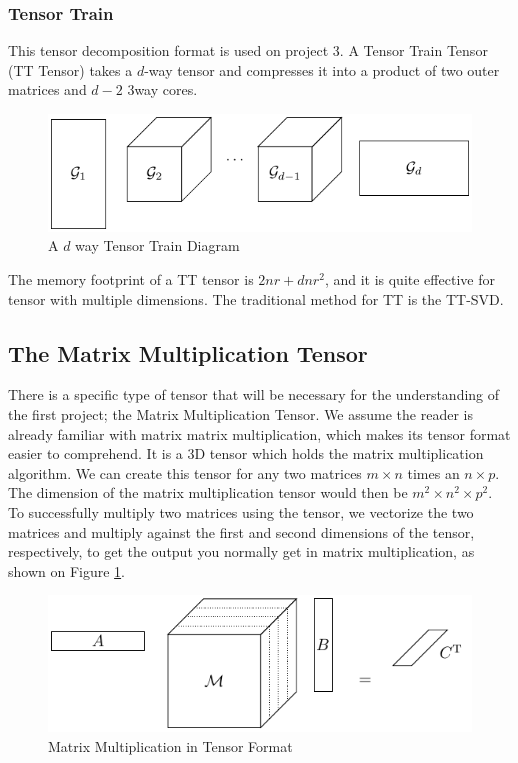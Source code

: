 \documentclass[MS]{wfuthesis}
\begin{document}
                \subsubsection{Tensor Train}
                    This tensor decomposition format is used on project 3. A Tensor Train Tensor (TT Tensor) takes a $d$-way tensor and compresses it into a product of two outer matrices and $d-2$ 3way cores.
                    \begin{figure}[ht]
                        \centering
                        \includegraphics[scale=1]{tikz/Tensor_Train.pdf}
                        \caption{A $d$ way Tensor Train Diagram}
                    \end{figure}
                    The memory footprint of a TT tensor is $2nr + dnr^2$, and it is quite effective for tensor with multiple dimensions. The traditional method for TT is the TT-SVD.

                \subsection{The Matrix Multiplication Tensor}
                    There is a specific type of tensor that will be necessary for the understanding of the first project; the Matrix Multiplication Tensor. We assume the reader is already familiar with matrix matrix multiplication, which makes its tensor format easier to comprehend. It is a 3D tensor which holds the matrix multiplication algorithm. We can create this tensor for any two matrices $m\times n$ times an $n \times p$. The dimension of the matrix multiplication tensor would then be $m^2 \times n^2 \times p^2$. To successfully multiply two matrices using the tensor, we vectorize the two matrices and multiply against the first and second dimensions of the tensor, respectively, to get the output you normally get in matrix multiplication, as shown on Figure \ref{fig:MatMulTensor}.
                    \begin{figure}[ht]
                        \centering
                        \includegraphics[scale=1]{tikz/MatMul_asTensor.pdf}
                        \caption{Matrix Multiplication in Tensor Format}
                        \label{fig:MatMulTensor}
                    \end{figure}
\end{document}

